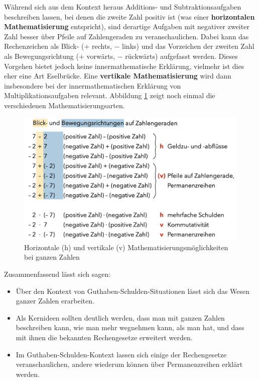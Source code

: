 \documentclass[
]{scrbook}
\providecommand{\tightlist}{%
  \setlength{\itemsep}{0pt}\setlength{\parskip}{0pt}}
\theoremstyle{definition}
\theoremstyle{definition}
\theoremstyle{definition}
\theoremstyle{definition}
\theoremstyle{remark}
\begin{document}
Während sich aus dem Kontext heraus Additions- und Subtraktionsaufgaben beschreiben lassen, bei denen die zweite Zahl positiv ist (was einer \textbf{horizontalen Mathematisierung} entspricht), sind derartige Aufgaben mit negativer zweiter Zahl besser über Pfeile auf Zahlengeraden zu veranschaulichen. Dabei kann das Rechenzeichen als Blick- (\(+\) rechts, \(-\) links) und das Vorzeichen der zweiten Zahl als Bewegungsrichtung (\(+\) vorwärts, \(-\) rückwärts) aufgefasst werden. Dieses Vorgehen bietet jedoch keine innermathematische Erklärung, vielmehr ist dies eher eine Art Eselbrücke. Eine \textbf{vertikale Mathematisierung} wird dann insbesondere bei der innermathematischen Erklärung von Multiplikationsaufgaben relevant. Abbildung \ref{fig:Mathematisierungen} zeigt noch einmal die verschiedenen Mathematisierungsarten.

\begin{figure}

{\centering \includegraphics[width=0.75\linewidth]{pictures/9-Mathematisierungen} 

}

\caption{Horizontale (h) und vertikale (v) Mathematisierungsmöglichkeiten bei ganzen Zahlen}\label{fig:Mathematisierungen}
\end{figure}

Zusammenfassend lässt sich sagen:

\begin{itemize}
\tightlist
\item
  \textcolor{concreteColor}{Über den Kontext von Guthaben-Schulden-Situationen lässt sich das Wesen ganzer Zahlen erarbeiten.}
\item
  \textcolor{concreteColor}{Als Kernideen sollten deutlich werden, dass man mit ganzen Zahlen beschreiben kann, wie man mehr wegnehmen kann, als man hat, und dass mit ihnen die bekannten Rechengesetze erweitert werden.}\\
\item
  \textcolor{concreteColor}{Im Guthaben-Schulden-Kontext lassen sich einige der Rechengesetze veranschaulichen, andere wiederum können über Permanenzreihen erklärt werden.}
\end{itemize}
\end{document}

